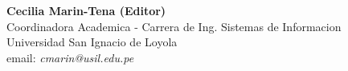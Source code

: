 \begin{center}
\textbf{Cecilia Marin-Tena (Editor)} \\
Coordinadora Academica - Carrera de Ing. Sistemas de Informacion \\
Universidad San Ignacio de Loyola \\
email: \textit{cmarin@usil.edu.pe} \\
\end{center}
